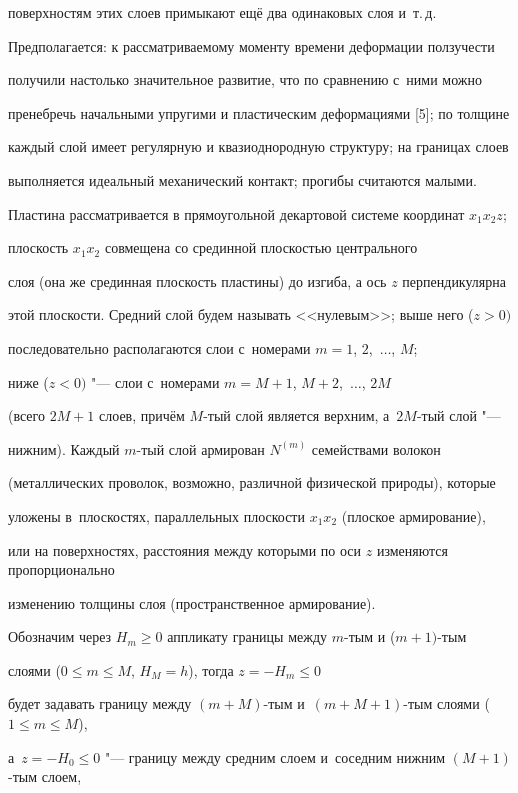 поверхностям этих слоев примыкают ещё два одинаковых слоя и~т.\,д. 

Предполагается: к рассматриваемому моменту времени деформации ползучести 

получили настолько значительное развитие, что по сравнению с~ними можно 

пренебречь начальными упругими и пластическим деформациями [5]; по толщине 

каждый слой имеет регулярную и квазиоднородную структуру; на границах слоев 

выполняется идеальный механический контакт; прогибы считаются малыми.



Пластина рассматривается в прямоугольной декартовой системе координат $x_1 x_2 z$; 

плоскость $x_1 x_2 $ совмещена со срединной плоскостью центрального 

слоя (она же срединная плоскость пластины) до изгиба, а ось $z$ перпендикулярна 

этой плоскости. Средний слой будем называть <<нулевым>>; выше него ($z > 0)$ 

последовательно располагаются слои с~номерами $m = 1$, $2$,~$\dots$, $M$; 

ниже ($z < 0)$ "--- слои с~номерами $m = M + 1$, $M + 2$,~$\dots$, $2M$ 

(всего $2M + 1$ слоев, причём $M$-тый слой является верхним, а~$2M$-тый слой "--- 

нижним). Каждый $m$-тый слой армирован $N^{(m)}$ семействами волокон 

(металлических проволок, возможно, различной физической природы), которые 

уложены в~плоскостях, параллельных плоскости $x_1 x_2 $ (плоское армирование), 

или на поверхностях, расстояния между которыми по оси $z$ изменяются пропорционально 

изменению толщины слоя (пространственное  армирование).



Обозначим через $H_m \geqslant 0$ аппликату границы между $m$-тым и ($m + 1)$-тым 

слоями ($0 \leqslant m \leqslant M$, $H_M = h$), тогда $z = - H_m \leqslant 0$ 

будет задавать границу между $(m + M)$-тым и~$(m + M + 1)$-тым слоями ($1\leqslant m \leqslant M$), 

а~$z = - H_0 \leqslant 0$ "--- границу между средним слоем и~соседним нижним $(M + 1)$-тым слоем, 

